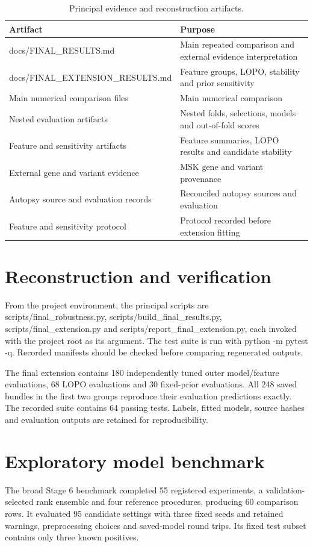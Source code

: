 \documentclass[12pt,a4paper,oneside]{report}
\begin{document}
\begin{table}[H]\centering
\caption{Principal evidence and reconstruction artifacts.}
{\small
\begin{tabularx}{\textwidth}{@{}>{\raggedright\arraybackslash}X>{\raggedright\arraybackslash}X@{}}\toprule
\textbf{Artifact} & \textbf{Purpose}\\\midrule
docs/FINAL\_\allowbreak RESULTS.md & Main repeated comparison and external evidence interpretation\\
docs/FINAL\_\allowbreak EXTENSION\_\allowbreak RESULTS.md & Feature groups, LOPO, stability and prior sensitivity\\
Main numerical comparison files & Main numerical comparison\\
Nested evaluation artifacts & Nested folds, selections, models and out-of-fold scores\\
Feature and sensitivity artifacts & Feature summaries, LOPO results and candidate stability\\
External gene and variant evidence & MSK gene and variant provenance\\
Autopsy source and evaluation records & Reconciled autopsy sources and evaluation\\
Feature and sensitivity protocol & Protocol recorded before extension fitting\\
\bottomrule\end{tabularx}}
\end{table}
\section{Reconstruction and verification}
From the project environment, the principal scripts are scripts/final\_\allowbreak robustness.py, scripts/build\_\allowbreak final\_\allowbreak results.py, scripts/final\_\allowbreak extension.py and scripts/report\_\allowbreak final\_\allowbreak extension.py, each invoked with the project root as its argument. The test suite is run with python -m pytest -q. Recorded manifests should be checked before comparing regenerated outputs.

The final extension contains 180 independently tuned outer model/feature evaluations, 68 LOPO evaluations and 30 fixed-prior evaluations. All 248 saved bundles in the first two groups reproduce their evaluation predictions exactly. The recorded suite contains 64 passing tests. Labels, fitted models, source hashes and evaluation outputs are retained for reproducibility.

\section{Exploratory model benchmark}
The broad Stage 6 benchmark completed 55 registered experiments, a validation-selected rank ensemble and four reference procedures, producing 60 comparison rows. It evaluated 95 candidate settings with three fixed seeds and retained warnings, preprocessing choices and saved-model round trips. Its fixed test subset contains only three known positives.
\end{document}
